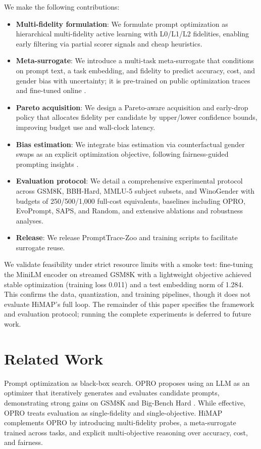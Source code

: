\documentclass{article}
\begin{document}
We make the following contributions:
\begin{itemize}
  \item \textbf{Multi-fidelity formulation}: We formulate prompt optimization as hierarchical multi-fidelity active learning with L0/L1/L2 fidelities, enabling early filtering via partial scorer signals and cheap heuristics.
  \item \textbf{Meta-surrogate}: We introduce a multi-task meta-surrogate that conditions on prompt text, a task embedding, and fidelity to predict accuracy, cost, and gender bias with uncertainty; it is pre-trained on public optimization traces and fine-tuned online \cite{yang-2023-large}.
  \item \textbf{Pareto acquisition}: We design a Pareto-aware acquisition and early-drop policy that allocates fidelity per candidate by upper/lower confidence bounds, improving budget use and wall-clock latency.
  \item \textbf{Bias estimation}: We integrate bias estimation via counterfactual gender swaps as an explicit optimization objective, following fairness-guided prompting insights \cite{ma-2023-fairness}.
  \item \textbf{Evaluation protocol}: We detail a comprehensive experimental protocol across GSM8K, BBH-Hard, MMLU-5 subject subsets, and WinoGender with budgets of 250/500/1,000 full-cost equivalents, baselines including OPRO, EvoPrompt, SAPS, and Random, and extensive ablations and robustness analyses.
  \item \textbf{Release}: We release PromptTrace-Zoo and training scripts to facilitate surrogate reuse.
\end{itemize}

We validate feasibility under strict resource limits with a smoke test: fine-tuning the MiniLM encoder on streamed GSM8K with a lightweight objective achieved stable optimization (training loss 0.011) and a test embedding norm of 1.284. This confirms the data, quantization, and training pipelines, though it does not evaluate HiMAP's full loop. The remainder of this paper specifies the framework and evaluation protocol; running the complete experiments is deferred to future work.

\section{Related Work}
Prompt optimization as black-box search. OPRO proposes using an LLM as an optimizer that iteratively generates and evaluates candidate prompts, demonstrating strong gains on GSM8K and Big-Bench Hard \cite{yang-2023-large}. While effective, OPRO treats evaluation as single-fidelity and single-objective. HiMAP complements OPRO by introducing multi-fidelity probes, a meta-surrogate trained across tasks, and explicit multi-objective reasoning over accuracy, cost, and fairness.
\end{document}
